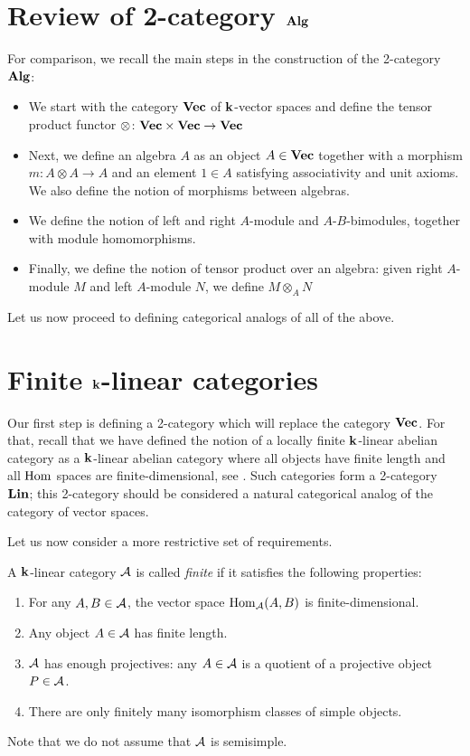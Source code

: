 \section{Review of 2-category $\mathbf{Alg}$}\label{s:alg-review}
For comparison, we recall the main steps in the construction of the 2-category $\mathbf{Alg}$:
\begin{itemize}
  \item We start with the category $\mathbf{Vec}$ of $\mathbf{k}$-vector spaces and define
    the tensor product functor $\otimes\colon\mathbf{Vec}\times\mathbf{Vec} \to \mathbf{Vec}$
  \item Next, we define an algebra $A$ as an object $A\in\mathbf{Vec}$ together with
    a morphism $m\colon A\otimes A\to A$ and an element $1\in A$ satisfying
    associativity and unit axioms. We also define the notion of morphisms between
    algebras.
  \item We define the notion of left and right $A$-module and $A$-$B$-bimodules,
  together with module homomorphisms.
  \item Finally, we define the notion of tensor product over an algebra: given right
  $A$-module $M$ and left $A$-module $N$, we define $M\otimes_A N$
\end{itemize}

Let us now proceed to defining categorical analogs of all of the above.

\section{Finite $\mathbf{k}$-linear categories}\label{s:finite-categories}
Our first step is defining a 2-category which will replace the category $\mathbf{Vec}$.
For that, recall that we have defined the notion of a locally finite
$\mathbf{k}$-linear abelian category as a $\mathbf{k}$-linear abelian category where all
objects have finite length and all $\operatorname{Hom}$ spaces are finite-dimensional, see
. Such categories form a 2-category $\mathbf{Lin}$; this
2-category should be considered a natural categorical analog of the category of
vector spaces.

Let us now consider a more restrictive set of requirements.

\begin{definition}\label{d:finite-linear}
  A $\mathbf{k}$-linear category $\mathcal{A}$ is called \emph{finite}
   if it satisfies the
  following properties:
  \begin{enumerate}
    \item For any $A,B\in \mathcal{A}$, the vector space $\operatorname{Hom}_{\mathcal{A}}(A,B)$ is
      finite-dimensional.

    \item Any object $A\in \mathcal{A}$ has finite length.
    \item $\mathcal{A}$ has enough projectives: any $A\in \mathcal{A}$ is a quotient of
     a projective object $P\in \mathcal{A}$.
    \item There are only finitely many isomorphism classes of simple objects.
  \end{enumerate}
\end{definition}
Note that we do not assume that $\mathcal{A}$ is semisimple.

